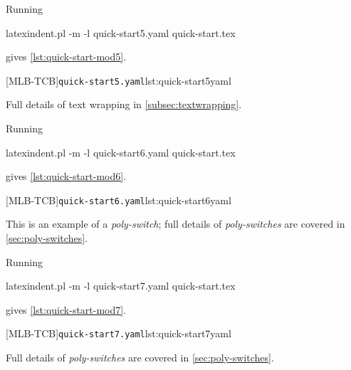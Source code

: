  \begin{example}
 Running

 \begin{commandshell}
latexindent.pl -m -l quick-start5.yaml quick-start.tex
\end{commandshell}

 gives \cref{lst:quick-start-mod5}.

 \begin{cmhtcbraster}
  [MLB-TCB]{\texttt{quick-start5.yaml}}{lst:quick-start5yaml}
 \end{cmhtcbraster}
 Full details of text wrapping in \cref{subsec:textwrapping}.
 \end{example}

 \begin{example}
 Running

 \begin{commandshell}
latexindent.pl -m -l quick-start6.yaml quick-start.tex
\end{commandshell}

 gives \cref{lst:quick-start-mod6}.

 \begin{cmhtcbraster}
  [MLB-TCB]{\texttt{quick-start6.yaml}}{lst:quick-start6yaml}
 \end{cmhtcbraster}
 This is an example of a \emph{poly-switch}; full details of \emph{poly-switches} are
 covered in \cref{sec:poly-switches}.
 \end{example}

 \begin{example}
 Running

 \begin{commandshell}
latexindent.pl -m -l quick-start7.yaml quick-start.tex
\end{commandshell}

 gives \cref{lst:quick-start-mod7}.

 \begin{cmhtcbraster}
  [MLB-TCB]{\texttt{quick-start7.yaml}}{lst:quick-start7yaml}
 \end{cmhtcbraster}
 Full details of \emph{poly-switches} are covered in \cref{sec:poly-switches}.
 \end{example}

